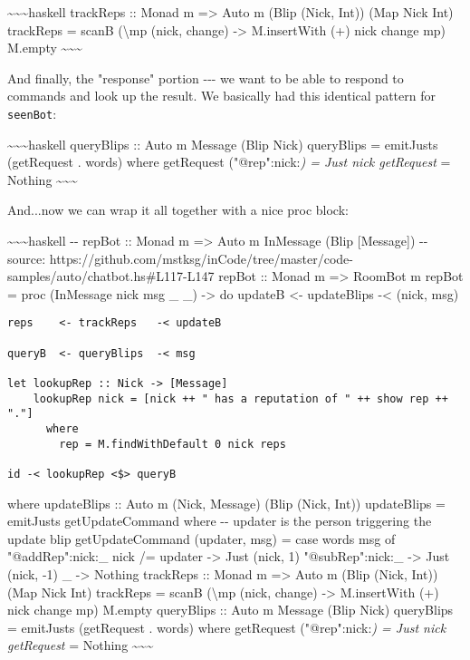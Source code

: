 \documentclass[]{article}
\begin{document}
\textasciitilde{}\textasciitilde{}\textasciitilde{}haskell trackReps :: Monad m
=\textgreater{} Auto m (Blip (Nick, Int)) (Map Nick Int) trackReps = scanB
(\textbackslash{}mp (nick, change) -\textgreater{} M.insertWith (+) nick change
mp) M.empty \textasciitilde{}\textasciitilde{}\textasciitilde{}

And finally, the "response" portion -\/-\/- we want to be able to respond to
commands and look up the result. We basically had this identical pattern for
\texttt{seenBot}:

\textasciitilde{}\textasciitilde{}\textasciitilde{}haskell queryBlips :: Auto m
Message (Blip Nick) queryBlips = emitJusts (getRequest . words) where getRequest
("@rep":nick:\emph{) = Just nick getRequest } = Nothing
\textasciitilde{}\textasciitilde{}\textasciitilde{}

And...now we can wrap it all together with a nice proc block:

\textasciitilde{}\textasciitilde{}\textasciitilde{}haskell -\/- repBot :: Monad
m =\textgreater{} Auto m InMessage (Blip {[}Message{]}) -\/- source:
https://github.com/mstksg/inCode/tree/master/code-samples/auto/chatbot.hs\#L117-L147
repBot :: Monad m =\textgreater{} RoomBot m repBot = proc (InMessage nick msg \_
\_) -\textgreater{} do updateB \textless{}- updateBlips -\textless{} (nick, msg)

\begin{verbatim}
reps    <- trackReps   -< updateB

queryB  <- queryBlips  -< msg

let lookupRep :: Nick -> [Message]
    lookupRep nick = [nick ++ " has a reputation of " ++ show rep ++ "."]
      where
        rep = M.findWithDefault 0 nick reps

id -< lookupRep <$> queryB
\end{verbatim}

where updateBlips :: Auto m (Nick, Message) (Blip (Nick, Int)) updateBlips =
emitJusts getUpdateCommand where -\/- updater is the person triggering the
update blip getUpdateCommand (updater, msg) = case words msg of
"@addRep":nick:\_ \textbar{} nick /= updater -\textgreater{} Just (nick, 1)
"@subRep":nick:\_ -\textgreater{} Just (nick, -1) \_ -\textgreater{} Nothing
trackReps :: Monad m =\textgreater{} Auto m (Blip (Nick, Int)) (Map Nick Int)
trackReps = scanB (\textbackslash{}mp (nick, change) -\textgreater{}
M.insertWith (+) nick change mp) M.empty queryBlips :: Auto m Message (Blip
Nick) queryBlips = emitJusts (getRequest . words) where getRequest
("@rep":nick:\emph{) = Just nick getRequest } = Nothing
\textasciitilde{}\textasciitilde{}\textasciitilde{}
\end{document}
